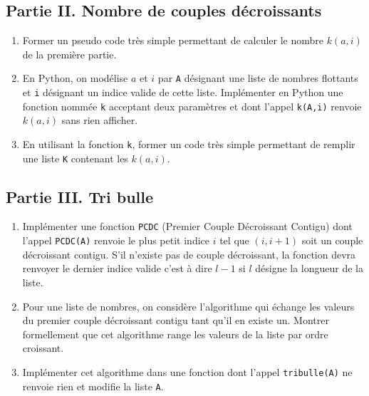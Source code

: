 \subsection*{Partie II. Nombre de couples décroissants}
\begin{enumerate}
  \item Former un pseudo code très simple permettant de calculer le nombre $k(a,i)$ de la première partie.
  \item En Python, on modélise $a$ et $i$ par \texttt{A} désignant une liste de nombres flottants et \texttt{i} désignant un indice valide de cette liste. Implémenter en Python une fonction nommée \texttt{k} acceptant deux paramètres et dont l'appel \texttt{k(A,i)} renvoie $k(a,i)$ sans rien afficher.
  \item En utilisant la fonction \texttt{k}, former un code très simple permettant de remplir une liste \texttt{K} contenant les $k(a,i)$.
\end{enumerate}

\subsection*{Partie III. Tri bulle}
\begin{enumerate}
  \item Implémenter une fonction \texttt{PCDC} (Premier Couple Décroissant Contigu) dont l'appel  \texttt{PCDC(A)} renvoie le plus petit indice $i$ tel que $(i,i+1)$ soit un couple décroissant contigu. S'il n'existe pas de couple décroissant, la fonction devra renvoyer le dernier indice valide c'est à dire $l-1$ si $l$ désigne la longueur de la liste.
  \item  Pour une liste de nombres, on considère l'algorithme qui échange les valeurs du premier couple décroissant contigu tant qu'il en existe un. Montrer formellement que cet algorithme range les valeurs de la liste par ordre croissant.
  \item Implémenter cet algorithme dans une fonction dont l'appel \texttt{tribulle(A)} ne renvoie rien et modifie la liste \texttt{A}.
\end{enumerate}
